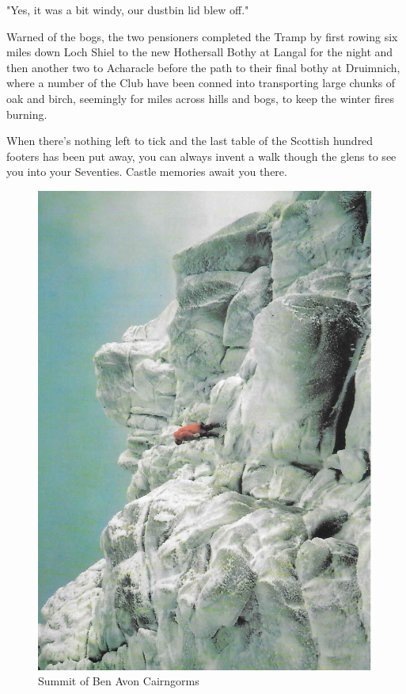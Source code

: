 \documentclass[a5paper,openany,font 10pt]{scrbook}
\begin{document}
"Yes, it was a bit windy, our dustbin lid blew off."

Warned of the bogs, the two pensioners completed the Tramp
by first rowing six miles down Loch Shiel to the new Hothersall
Bothy at Langal for the night  and then another two to Acharacle
before the path to their final bothy at Druimnich, where a number
of the Club have been conned into transporting large chunks of
oak and birch, seemingly for miles across hills and bogs, to keep
the winter fires burning.

When there's nothing left to tick and the last table of the
Scottish hundred footers has been put away, you can always invent
a walk though the glens to see you into your Seventies. Castle
memories await you there.
\begin{figure}[htb]
\centering
\includegraphics[width=.9\linewidth]{./images/Summit_of_Ben_Avon_Cairngorms.jpg}
\caption{\label{fig:org51fdc4f}
Summit of Ben Avon Cairngorms}
\end{figure}
\end{document}
